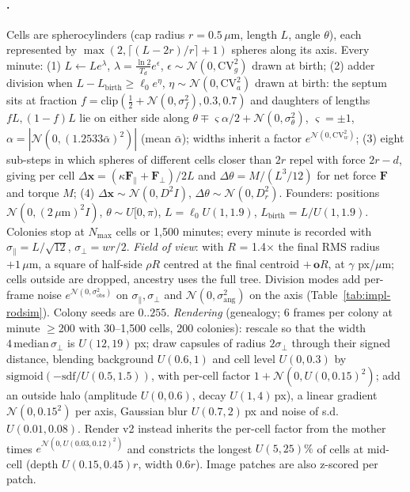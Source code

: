 \paragraph{\rodsim.}
Cells are spherocylinders (cap radius $r{=}0.5\,\mu$m, length $L$, angle $\theta$), each represented by $\max(2,\lceil(L{-}2r)/r\rceil{+}1)$ spheres along its axis. Every minute:
(1) $L\leftarrow Le^{\lambda}$, $\lambda=\frac{\ln2}{T_d}e^{\epsilon}$, $\epsilon\sim\mathcal{N}(0,\mathrm{CV}_g^2)$ drawn at birth;
(2) adder division when $L{-}L_{\text{birth}}\ge\ell_0e^{\eta}$, $\eta\sim\mathcal{N}(0,\mathrm{CV}_a^2)$ drawn at birth: the septum sits at fraction $f=\mathrm{clip}(\frac12{+}\mathcal{N}(0,\sigma_f^2),0.3,0.7)$ and daughters of lengths $fL,(1{-}f)L$ lie on either side along $\theta\mp\varsigma\alpha/2+\mathcal{N}(0,\sigma_\theta^2)$, $\varsigma{=}\pm1$, $\alpha=|\mathcal{N}(0,(1.2533\bar\alpha)^2)|$ (mean $\bar\alpha$); widths inherit a factor $e^{\mathcal{N}(0,\mathrm{CV}_w^2)}$;
(3) eight sub-steps in which spheres of different cells closer than $2r$ repel with force $2r{-}d$, giving per cell $\Delta\mathbf{x}=(\kappa\mathbf{F}_\parallel{+}\mathbf{F}_\perp)/2L$ and $\Delta\theta=M/(L^3/12)$ for net force $\mathbf{F}$ and torque $M$;
(4) $\Delta\mathbf{x}\sim\mathcal{N}(0,D^2I)$, $\Delta\theta\sim\mathcal{N}(0,D_r^2)$.
Founders: positions $\mathcal{N}(0,(2\,\mu\text{m})^2I)$, $\theta\sim U[0,\pi)$, $L=\ell_0U(1,1.9)$, $L_{\text{birth}}=L/U(1,1.9)$.
Colonies stop at $N_{\max}$ cells or 1{,}500 minutes; every minute is recorded with $\sigma_\parallel=L/\sqrt{12}$, $\sigma_\perp=wr/2$.
\emph{Field of view}: with $R$ = 1.4$\times$ the final RMS radius ${+}1\,\mu$m, a square of half-side $\rho R$ centred at the final centroid ${+}\,\mathbf{o}R$, at $\gamma$ px/$\mu$m; cells outside are dropped, ancestry uses the full tree.
Division modes add per-frame noise $e^{\mathcal{N}(0,\sigma_{\text{obs}}^2)}$ on $\sigma_\parallel,\sigma_\perp$ and $\mathcal{N}(0,\sigma_{\text{ang}}^2)$ on the axis (Table~\ref{tab:impl-rodsim}). Colony seeds are $0..255$.
\emph{Rendering} (\rodsim genealogy; 6 frames per colony at minute $\ge$200 with 30--1{,}500 cells, 200 colonies): rescale so that the width $4\,\mathrm{median}\,\sigma_\perp$ is $U(12,19)$\,px; draw capsules of radius $2\sigma_\perp$ through their signed distance, blending background $U(0.6,1)$ and cell level $U(0,0.3)$ by $\mathrm{sigmoid}(-\mathrm{sdf}/U(0.5,1.5))$, with per-cell factor $1{+}\mathcal{N}(0,U(0,0.15)^2)$; add an outside halo (amplitude $U(0,0.6)$, decay $U(1,4)$\,px), a linear gradient $\mathcal{N}(0,0.15^2)$ per axis, Gaussian blur $U(0.7,2)$\,px and noise of s.d.\ $U(0.01,0.08)$.
Render v2 instead inherits the per-cell factor from the mother times $e^{\mathcal{N}(0,U(0.03,0.12)^2)}$ and constricts the longest $U(5,25)\%$ of cells at mid-cell (depth $U(0.15,0.45)r$, width $0.6r$). Image patches are also z-scored per patch.

